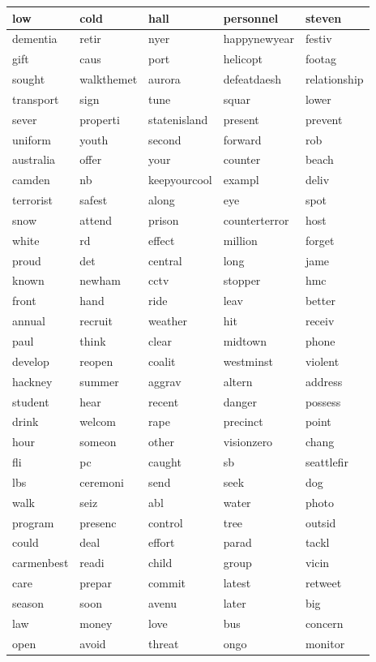 \begin{longtable}{p{2.5cm}p{2.5cm}p{2.5cm}p{2.5cm}p{2.5cm}}
low&cold&hall&personnel&steven\\ \hline 
dementia&retir&nyer&happynewyear&festiv\\ \hline 
gift&caus&port&helicopt&footag\\ \hline 
sought&walkthemet&aurora&defeatdaesh&relationship\\ \hline 
transport&sign&tune&squar&lower\\ \hline 
sever&properti&statenisland&present&prevent\\ \hline 
uniform&youth&second&forward&rob\\ \hline 
australia&offer&your&counter&beach\\ \hline 
camden&nb&keepyourcool&exampl&deliv\\ \hline 
terrorist&safest&along&eye&spot\\ \hline 
snow&attend&prison&counterterror&host\\ \hline 
white&rd&effect&million&forget\\ \hline 
proud&det&central&long&jame\\ \hline 
known&newham&cctv&stopper&hmc\\ \hline 
front&hand&ride&leav&better\\ \hline 
annual&recruit&weather&hit&receiv\\ \hline 
paul&think&clear&midtown&phone\\ \hline 
develop&reopen&coalit&westminst&violent\\ \hline 
hackney&summer&aggrav&altern&address\\ \hline 
student&hear&recent&danger&possess\\ \hline 
drink&welcom&rape&precinct&point\\ \hline 
hour&someon&other&visionzero&chang\\ \hline 
fli&pc&caught&sb&seattlefir\\ \hline 
lbs&ceremoni&send&seek&dog\\ \hline 
walk&seiz&abl&water&photo\\ \hline 
program&presenc&control&tree&outsid\\ \hline 
could&deal&effort&parad&tackl\\ \hline 
carmenbest&readi&child&group&vicin\\ \hline 
care&prepar&commit&latest&retweet\\ \hline 
season&soon&avenu&later&big\\ \hline 
law&money&love&bus&concern\\ \hline 
open&avoid&threat&ongo&monitor\\ \hline 

\end{longtable}
